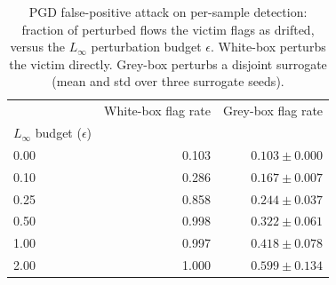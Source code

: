 \begin{table}
\caption{PGD false-positive attack on per-sample detection: fraction of perturbed flows the victim flags as drifted, versus the $L_\infty$ perturbation budget $\epsilon$. White-box perturbs the victim directly. Grey-box perturbs a disjoint surrogate (mean and std over three surrogate seeds).}
\label{tab:rq3-pgd-false-positive}
\centering
\begin{tabular}{lrr}
\toprule
& White-box flag rate & Grey-box flag rate \\
$L_\infty$ budget ($\epsilon$) & & \\
\midrule
0.00 & 0.103 & $0.103 \pm 0.000$ \\
0.10 & 0.286 & $0.167 \pm 0.007$ \\
0.25 & 0.858 & $0.244 \pm 0.037$ \\
0.50 & 0.998 & $0.322 \pm 0.061$ \\
1.00 & 0.997 & $0.418 \pm 0.078$ \\
2.00 & 1.000 & $0.599 \pm 0.134$ \\
\bottomrule
\end{tabular}
\end{table}
